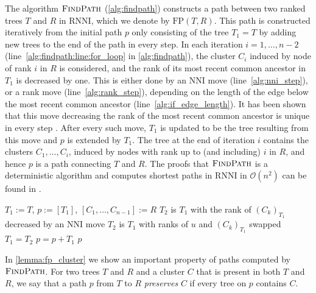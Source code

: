 \documentclass[11pt]{amsart}
\newcommand{\rnni}{\mathrm{RNNI}}
\newcommand{\findpath}{\textsc{FindPath}}
\newcommand{\rank}{\mathrm{rank}}
\newcommand{\nni}{\mathrm{NNI}}
\newcommand{\fp}{\mathrm{FP}}
\renewcommand{\O}{\mathcal O}
\newcommand{\summary}[1]{} %
\begin{document}
\summary{Explain $\findpath$ in $\rnni$}
The algorithm $\findpath$ (\autoref{alg:findpath}) constructs a path between two ranked trees $T$ and $R$ in $\rnni$, which we denote by $\fp(T,R)$.
This path is constructed iteratively from the initial path $p$ only consisting of the tree $T_1 = T$ by adding new trees to the end of the path in every step.
In each iteration $i = 1, \ldots, n-2$ (line~\ref{alg:findpath:line:for_loop} in \autoref{alg:findpath}), the cluster $C_i$ induced by node of rank $i$ in $R$ is considered, and the rank of its most recent common ancestor in $T_1$ is decreased by one.
This is either done by an $\nni$ move (line~\ref{alg:nni_step}), or a rank move (line~\ref{alg:rank_step}), depending on the length of the edge below the most recent common ancestor (line~\ref{alg:if_edge_length}).
It has been shown that this move decreasing the rank of the most recent common ancestor is unique in every step \autocite[Proposition 1]{Collienne2021}.
After every such move, $T_1$ is updated to be the tree resulting from this move and $p$ is extended by $T_1$.
The tree at the end of iteration $i$ contains the clusters $C_1, \ldots, C_i$, induced by nodes with rank up to (and including) $i$ in $R$, and hence $p$ is a path connecting $T$ and $R$.
The proofs that $\findpath$ is a deterministic algorithm and computes shortest paths in $\rnni$ in $\O(n^2)$ can be found in \autocite{Collienne2021}.

\begin{algorithm}[ht]
	\caption{$\findpath$($T,R$)}
	\label{alg:findpath}
	\begin{algorithmic}[1]
	\STATE $T_1 := T$, $p := [T_1]$, $[C_1, \ldots, C_{n-1}] := R$
	\label{alg:findpath:line:for_loop}
		\WHILE {$\rank((C_k)_{T_1})>k$}
		\label{alg:findpath:line:while_loop}
				\label{alg:if_edge_length}
				\STATE $T_2$ is $T_1$ with the rank of $(C_k)_{T_1}$ decreased by an $\nni$ move
				\label{alg:nni_step}
			\ELSE
				\STATE $T_2$ is $T_1$ with ranks of $u$ and $(C_k)_{T_1}$ swapped
				\label{alg:rank_step}
			\ENDIF
			\STATE $T_1 = T_2$
			\STATE $p = p+T_1$
		\ENDWHILE
	\ENDFOR
	\RETURN $p$
	\end{algorithmic}
\end{algorithm}

In \autoref{lemma:fp_cluster} we show an important property of paths computed by $\findpath$.
For two trees $T$ and $R$ and a cluster $C$ that is present in both $T$ and $R$, we say that a path $p$ from $T$ to $R$ \emph{preserves} $C$ if every tree on $p$ contains $C$.
\end{document}
